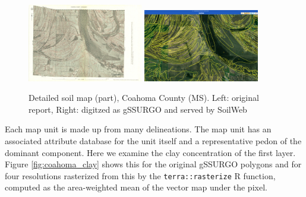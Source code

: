 \documentclass[soil, manuscript]{copernicus}
\begin{document}
\begin{figure}
  \includegraphics[width=0.45\textwidth]{usda-general-soil-map-of-coahoma-county-mississippi_Plate32.jpg}
  \hfill
  \includegraphics[width=0.45\textwidth]{SoilWeb_coahoma-county-mississipp_Plate32.png} 
 \caption{Detailed soil map (part), Coahoma County (MS). Left: original report, Right: digitzed as gSSURGO and served by SoilWeb}
  \label{fig:coahoma}
\end{figure}

%
\par
Each map unit is made up from many delineations. The map unit has an associated attribute database for the unit itself and a representative pedon of the dominant component.
%
Here we examine the clay concentration of the first layer.
%
Figure \ref{fig:coahoma_clay} shows this for the original gSSURGO polygons and for four resolutions rasterized from this by the \texttt{terra::rasterize} R function, computed as the area-weighted mean of the vector map under the pixel.
\end{document}
